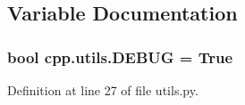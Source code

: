 \subsection{Variable Documentation}
\subsubsection[{\texorpdfstring{D\+E\+B\+UG}{DEBUG}}]{\setlength{\rightskip}{0pt plus 5cm}bool cpp.\+utils.\+D\+E\+B\+UG = True}\hypertarget{namespacecpp_1_1utils_aa59cfd61e9b0495b717753e45fe9d201}{}\label{namespacecpp_1_1utils_aa59cfd61e9b0495b717753e45fe9d201}


Definition at line 27 of file utils.\+py.

